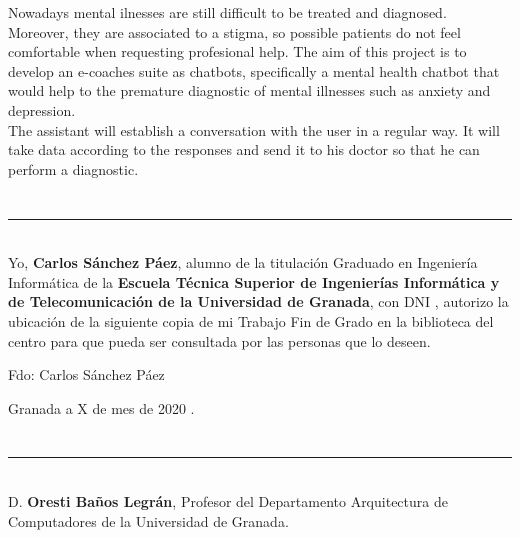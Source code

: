 Nowadays mental ilnesses are still difficult to be treated and diagnosed. Moreover, they are associated to a stigma, so possible patients do not feel
comfortable when requesting profesional help. The aim of this project is to develop an e-coaches suite as chatbots, specifically a mental health chatbot
that would help to the premature diagnostic of mental illnesses such as anxiety and depression.\\

The assistant will establish a conversation with the user in a regular way. It will take data according to the responses and send it to his doctor so that
he can perform a diagnostic.

\newpage

\section*{}
\thispagestyle{empty}

\noindent\rule[-1ex]{\textwidth}{2pt}\\[4.5ex]

Yo, \textbf{Carlos Sánchez Páez}, alumno de la titulación Graduado en Ingeniería Informática de la \textbf{Escuela Técnica Superior
de Ingenierías Informática y de Telecomunicación de la Universidad de Granada}, con DNI , autorizo la
ubicación de la siguiente copia de mi Trabajo Fin de Grado en la biblioteca del centro para que pueda ser
consultada por las personas que lo deseen.

\vspace{6cm}

\begin{center}
  Fdo: Carlos Sánchez Páez

\end{center}

\vspace{2cm}

\begin{flushright}
Granada a X de mes de 2020 .
\end{flushright}

\newpage

\section*{}
\thispagestyle{empty}

\noindent\rule[-1ex]{\textwidth}{2pt}\\[4.5ex]

D. \textbf{Oresti Baños Legrán}, Profesor del Departamento Arquitectura de Computadores de la Universidad de Granada.



